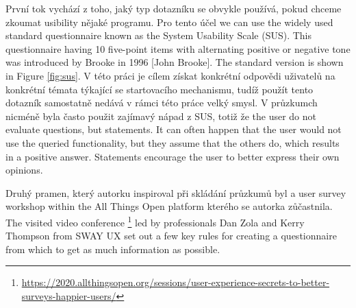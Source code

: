 \documentclass[a4paper,10pt,twoside]{article}
\begin{document}
První tok vychází z toho, jaký typ dotazníku se obvykle používá, pokud chceme zkoumat usibility nějaké programu. Pro tento účel we can use the widely used standard questionnaire known as the System Usability Scale (SUS). This questionnaire having 10 five-point items with alternating positive or negative tone was introduced by Brooke in 1996 [John Brooke]. The standard version is shown in Figure \ref{fig:sus}. V této práci je cílem získat konkrétní odpovědi uživatelů na konkrétní témata týkající se startovacího mechanismu, tudíž použít tento dotazník samostatně nedává v rámci této práce velký smysl. V průzkumch nicméně byla často použit zajímavý nápad z SUS, totiž že the user do not evaluate questions, but statements. It can often happen that the user would not use the queried functionality, but they assume that the others do, which results in a positive answer. Statements encourage the user to better express their own opinions.

Druhý pramen, který autorku inspiroval při skládání průzkumů byl a user survey workshop within the All Things Open platform kterého se autorka zůčastnila. The visited video conference \footnote{\url{https://2020.allthingsopen.org/sessions/user-experience-secrets-to-better-surveys-happier-users/}} led by professionals Dan Zola and Kerry Thompson from SWAY UX set out a few key rules for creating a questionnaire from which to get as much information as possible.
\end{document}
